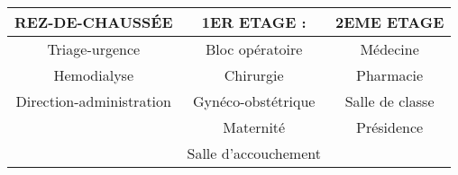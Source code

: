 		\medskip
		\begin{tabular}{|c|c|c|}
		\hline  REZ-DE-CHAUSSÉE & 1ER ETAGE : & 2EME ETAGE \\ 
		\hline Triage-urgence & Bloc opératoire & Médecine \\ 
		 Hemodialyse & Chirurgie  & Pharmacie \\ 
		 Direction-administration & Gynéco-obstétrique & Salle de classe \\ 
		  & Maternité & Présidence \\ 
		  & Salle d'accouchement &  \\ 
		\hline 
		\end{tabular} 
		
